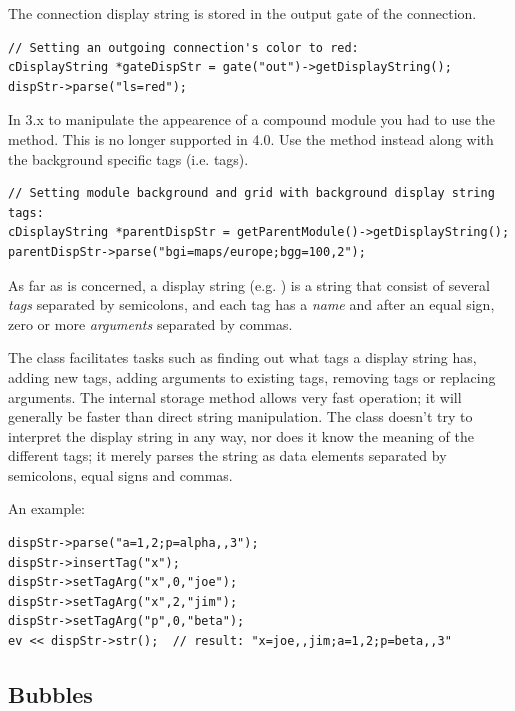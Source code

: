 \begin{note}
The connection display string is stored in the output gate of the connection.
\end{note}

\begin{verbatim}
// Setting an outgoing connection's color to red:
cDisplayString *gateDispStr = gate("out")->getDisplayString();
dispStr->parse("ls=red");
\end{verbatim}

\begin{note}
In {\opp} 3.x to manipulate the appearence of a compound module you had to use
the  method. This is no longer supported in 
{\opp} 4.0. Use the  method instead along with the background
specific tags (i.e.  tags).
\end{note}

\begin{verbatim}
// Setting module background and grid with background display string tags:
cDisplayString *parentDispStr = getParentModule()->getDisplayString();
parentDispStr->parse("bgi=maps/europe;bgg=100,2");
\end{verbatim}

As far as  is concerned, a display string
(e.g. ) is a string that consist of several
\textit{tags} separated by semicolons, and each tag has a \textit{name}
and after an equal sign, zero or more \textit{arguments} separated by commas.

The class facilitates tasks such as finding out what tags a display string
has, adding new tags, adding arguments to existing tags,
removing tags or replacing arguments. The internal storage method allows
very fast operation; it will generally be faster than direct string manipulation.
The class doesn't try to interpret the display string in any way, nor does
it know the meaning of the different tags; it merely parses the string
as data elements separated by semicolons, equal signs and commas.

An example:

\begin{verbatim}
dispStr->parse("a=1,2;p=alpha,,3");
dispStr->insertTag("x");
dispStr->setTagArg("x",0,"joe");
dispStr->setTagArg("x",2,"jim");
dispStr->setTagArg("p",0,"beta");
ev << dispStr->str();  // result: "x=joe,,jim;a=1,2;p=beta,,3"
\end{verbatim}

\subsection{Bubbles}

